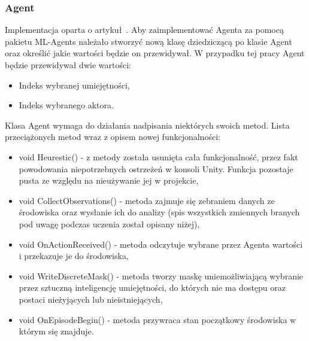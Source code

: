 \documentclass{SGGW-thesis}
\begin{document}
\subsubsection{Agent}
Implementacja oparta o artykuł~\cite{MLAgentsStartegyGuide}. Aby zaimplementować Agenta za pomocą pakietu ML-Agents należało stworzyć nową klasę dziedziczącą po klasie Agent oraz określić jakie wartości będzie on przewidywał. 
W przypadku tej pracy Agent będzie przewidywał dwie wartości: 
\begin{itemize}
  \item{Indeks wybranej umiejętności},
  \item{Indeks wybranego aktora}.
\end{itemize}
Klasa Agent wymaga do działania nadpisania niektórych swoich metod. Lista przeciążonych metod wraz z opisem nowej funkcjonalności:
\begin{itemize}
  \item{void Heurestic() - z metody została usunięta cała funkcjonalność, przez fakt powodowania niepotrzebnych ostrzeżeń w konsoli Unity. Funkcja pozostaje pusta ze względu na nieużywanie jej w projekcie},
  \item{void CollectObservations() - metoda zajmuje się zebraniem danych ze środowiska oraz wysłanie ich do analizy (spis wszystkich zmiennych branych pod uwagę podczas uczenia został opisany niżej)},
  \item{void OnActionReceived() - metoda odczytuje wybrane przez Agenta wartości i przekazuje je do środowiska},
  \item{void WriteDiscreteMask() - metoda tworzy maskę uniemożliwiającą wybranie przez sztuczną inteligencję umiejętności, do których nie ma dostępu oraz postaci nieżyjących lub nieistniejących},
  \item{void OnEpisodeBegin() - metoda przywraca stan początkowy środowiska w którym się znajduje}.
\end{itemize}
\end{document}
